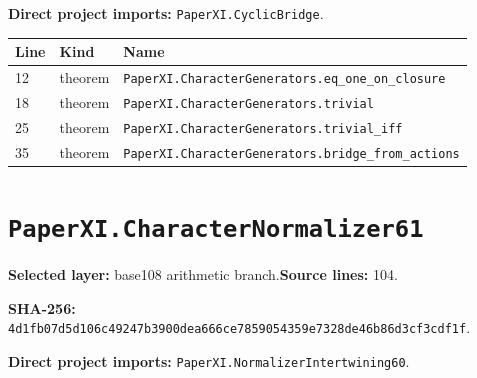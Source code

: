 \documentclass[10pt,oneside]{book}
\begin{document}
\textbf{Direct project imports:} \nolinkurl{PaperXI.CyclicBridge}.

\begin{longtable}{@{}p{}p{}p{}@{}}\toprule Line&Kind&Name\\\midrule\endhead

12&theorem&\nolinkurl{PaperXI.CharacterGenerators.eq_one_on_closure}\\

18&theorem&\nolinkurl{PaperXI.CharacterGenerators.trivial}\\

25&theorem&\nolinkurl{PaperXI.CharacterGenerators.trivial_iff}\\

35&theorem&\nolinkurl{PaperXI.CharacterGenerators.bridge_from_actions}\\

\bottomrule\end{longtable}

\section{\texorpdfstring{\nolinkurl{PaperXI.CharacterNormalizer61}}{PaperXI.CharacterNormalizer61}}\label{module:PaperXI.CharacterNormalizer61}

\textbf{Selected layer:} base108 arithmetic branch.\quad\textbf{Source lines:} 104.\par\textbf{SHA-256:} {\scriptsize\nolinkurl{4d1fb07d5d106c49247b3900dea666ce7859054359e7328de46b86d3cf3cdf1f}}.


\textbf{Direct project imports:} \nolinkurl{PaperXI.NormalizerIntertwining60}.
\end{document}
